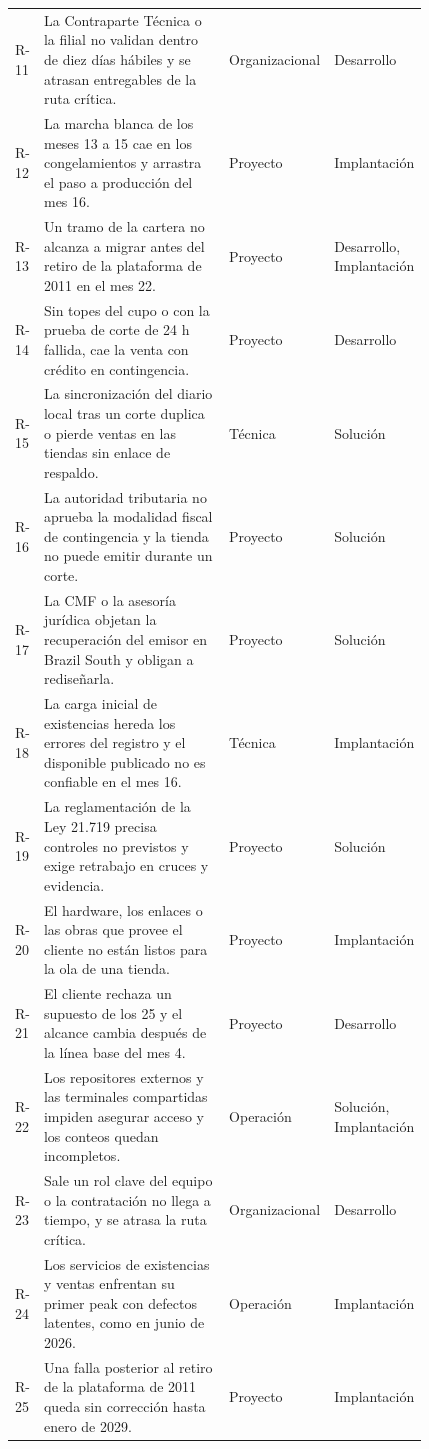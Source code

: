 \documentclass[11pt]{article}
\begin{document}
\begin{longtable}{p{0.060\linewidth}p{0.470\linewidth}p{0.140\linewidth}p{0.150\linewidth}}
R-11 & La Contraparte Técnica o la filial no validan dentro de diez días hábiles y se atrasan entregables de la ruta crítica. & Organizacional & Desarrollo \\
R-12 & La marcha blanca de los meses 13 a 15 cae en los congelamientos y arrastra el paso a producción del mes 16. & Proyecto & Implantación \\
R-13 & Un tramo de la cartera no alcanza a migrar antes del retiro de la plataforma de 2011 en el mes 22. & Proyecto & Desarrollo, Implantación \\
R-14 & Sin topes del cupo o con la prueba de corte de 24 h fallida, cae la venta con crédito en contingencia. & Proyecto & Desarrollo \\
R-15 & La sincronización del diario local tras un corte duplica o pierde ventas en las tiendas sin enlace de respaldo. & Técnica & Solución \\
R-16 & La autoridad tributaria no aprueba la modalidad fiscal de contingencia y la tienda no puede emitir durante un corte. & Proyecto & Solución \\
R-17 & La CMF o la asesoría jurídica objetan la recuperación del emisor en Brazil South y obligan a rediseñarla. & Proyecto & Solución \\
R-18 & La carga inicial de existencias hereda los errores del registro y el disponible publicado no es confiable en el mes 16. & Técnica & Implantación \\
R-19 & La reglamentación de la Ley 21.719 precisa controles no previstos y exige retrabajo en cruces y evidencia. & Proyecto & Solución \\
R-20 & El hardware, los enlaces o las obras que provee el cliente no están listos para la ola de una tienda. & Proyecto & Implantación \\
R-21 & El cliente rechaza un supuesto de los 25 y el alcance cambia después de la línea base del mes 4. & Proyecto & Desarrollo \\
R-22 & Los repositores externos y las terminales compartidas impiden asegurar acceso y los conteos quedan incompletos. & Operación & Solución, Implantación \\
R-23 & Sale un rol clave del equipo o la contratación no llega a tiempo, y se atrasa la ruta crítica. & Organizacional & Desarrollo \\
R-24 & Los servicios de existencias y ventas enfrentan su primer peak con defectos latentes, como en junio de 2026. & Operación & Implantación \\
R-25 & Una falla posterior al retiro de la plataforma de 2011 queda sin corrección hasta enero de 2029. & Proyecto & Implantación \\

\end{longtable}
\end{document}
